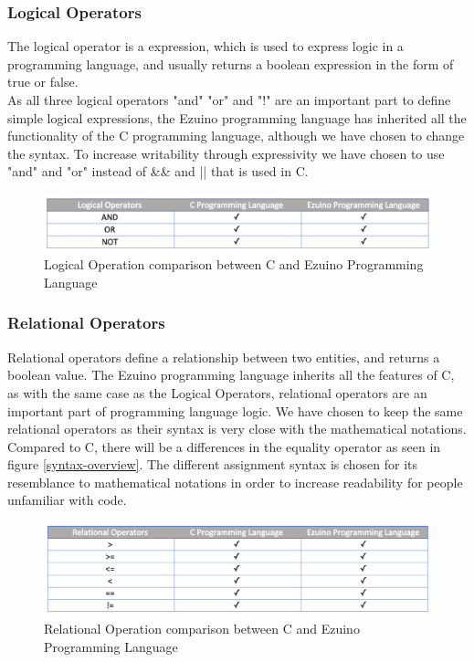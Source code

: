 \subsubsection*{Logical Operators}
The logical operator is a expression, which is used to express logic in a programming language, and usually returns a boolean expression in the form of true or false. \\
As all three logical operators "and" "or" and "!" are an important part to define simple logical expressions, the Ezuino programming language has inherited all the functionality of the C programming language, although we have chosen to change the syntax. To increase writability through expressivity we have chosen to use "and" and "or" instead of \&\& and || that is used in C.\\
\begin{figure}[H]
\centering
\includegraphics[scale=0.60]{figures/language_features/langf03.png}
\caption{Logical Operation comparison between C and Ezuino Programming Language}
\label{lf03}
\end{figure}
\subsubsection*{Relational Operators}
Relational operators define a relationship between two entities, and returns a boolean value.  
The Ezuino programming language inherits all the features of C, as with the same case as the Logical Operators, relational operators are an important part of programming language logic. We have chosen to keep the same relational operators as their syntax is very close with the mathematical notations. Compared to C, there will be a differences in the equality operator as seen in figure \ref{syntax-overview}. The different assignment syntax is chosen for its resemblance to mathematical notations in order to increase readability for people unfamiliar with code. 
\begin{figure}[H]
\centering
\includegraphics[scale=0.60]{figures/language_features/langf04.png}
\caption{Relational Operation comparison between C and Ezuino Programming Language}
\label{lf04}
\end{figure}

